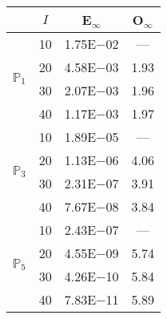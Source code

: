 \begin{table}[H]
\centering
\begin{tabular}{@{}l c c c@{}}
\toprule
 & $I$ & E$_{\infty}$ & O$_{\infty}$\\
\midrule
\multirow{4}{*}{$\mathbb{P}_{1}$}
 & 10 & 1.75E$-$02 & ---\\
 & 20 & 4.58E$-$03 & 1.93  \\
 & 30 & 2.07E$-$03 & 1.96  \\
 & 40 & 1.17E$-$03 & 1.97  \\
\midrule
\multirow{4}{*}{$\mathbb{P}_{3}$}
 & 10 & 1.89E$-$05 & ---\\
 & 20 & 1.13E$-$06 & 4.06  \\
 & 30 & 2.31E$-$07 & 3.91  \\
 & 40 & 7.67E$-$08 & 3.84  \\
\midrule
\multirow{4}{*}{$\mathbb{P}_{5}$}
 & 10 & 2.43E$-$07 & ---\\
 & 20 & 4.55E$-$09 & 5.74  \\
 & 30 & 4.26E$-$10 & 5.84  \\
 & 40 & 7.83E$-$11 & 5.89  \\
\bottomrule
\end{tabular}
\end{table}

